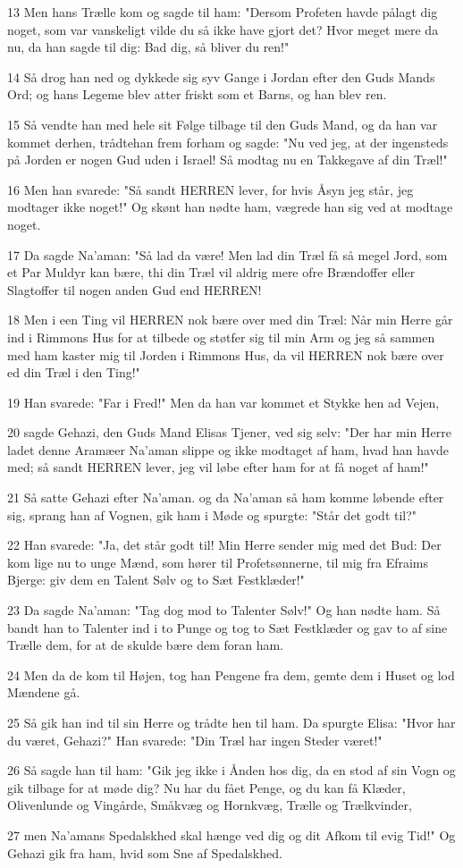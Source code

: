 \par 13 Men hans Trælle kom og sagde til ham: "Dersom Profeten havde pålagt dig noget, som var vanskeligt vilde du så ikke have gjort det? Hvor meget mere da nu, da han sagde til dig: Bad dig, så bliver du ren!"
\par 14 Så drog han ned og dykkede sig syv Gange i Jordan efter den Guds Mands Ord; og hans Legeme blev atter friskt som et Barns, og han blev ren.
\par 15 Så vendte han med hele sit Følge tilbage til den Guds Mand, og da han var kommet derhen, trådtehan frem forham og sagde: "Nu ved jeg, at der ingensteds på Jorden er nogen Gud uden i Israel! Så modtag nu en Takkegave af din Træl!"
\par 16 Men han svarede: "Så sandt HERREN lever, for hvis Åsyn jeg står, jeg modtager ikke noget!" Og skønt han nødte ham, vægrede han sig ved at modtage noget.
\par 17 Da sagde Na'aman: "Så lad da være! Men lad din Træl få så megel Jord, som et Par Muldyr kan bære, thi din Træl vil aldrig mere ofre Brændoffer eller Slagtoffer til nogen anden Gud end HERREN!
\par 18 Men i een Ting vil HERREN nok bære over med din Træl: Når min Herre går ind i Rimmons Hus for at tilbede og støtfer sig til min Arm og jeg så sammen med ham kaster mig til Jorden i Rimmons Hus, da vil HERREN nok bære over ed din Træl i den Ting!"
\par 19 Han svarede: "Far i Fred!" Men da han var kommet et Stykke hen ad Vejen,
\par 20 sagde Gehazi, den Guds Mand Elisas Tjener, ved sig selv: "Der har min Herre ladet denne Aramæer Na'aman slippe og ikke modtaget af ham, hvad han havde med; så sandt HERREN lever, jeg vil løbe efter ham for at få noget af ham!"
\par 21 Så satte Gehazi efter Na'aman. og da Na'aman så ham komme løbende efter sig, sprang han af Vognen, gik ham i Møde og spurgte: "Står det godt til?"
\par 22 Han svarede: "Ja, det står godt til! Min Herre sender mig med det Bud: Der kom lige nu to unge Mænd, som hører til Profetsønnerne, til mig fra Efraims Bjerge: giv dem en Talent Sølv og to Sæt Festklæder!"
\par 23 Da sagde Na'aman: "Tag dog mod to Talenter Sølv!" Og han nødte ham. Så bandt han to Talenter ind i to Punge og tog to Sæt Festklæder og gav to af sine Trælle dem, for at de skulde bære dem foran ham.
\par 24 Men da de kom til Højen, tog han Pengene fra dem, gemte dem i Huset og lod Mændene gå.
\par 25 Så gik han ind til sin Herre og trådte hen til ham. Da spurgte Elisa: "Hvor har du været, Gehazi?" Han svarede: "Din Træl har ingen Steder været!"
\par 26 Så sagde han til ham: "Gik jeg ikke i Ånden hos dig, da en stod af sin Vogn og gik tilbage for at møde dig? Nu har du fået Penge, og du kan få Klæder, Olivenlunde og Vingårde, Småkvæg og Hornkvæg, Trælle og Trælkvinder,
\par 27 men Na'amans Spedalskhed skal hænge ved dig og dit Afkom til evig Tid!" Og Gehazi gik fra ham, hvid som Sne af Spedalskhed.


